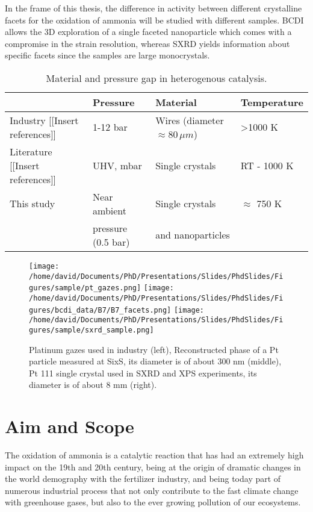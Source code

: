 In the frame of this thesis, the difference in activity between different crystalline facets for the oxidation of ammonia will be studied with different samples.
BCDI allows the 3D exploration of a single faceted nanoparticle which comes with a compromise in the strain resolution, whereas SXRD yields information about specific facets since the samples are large monocrystals.

\begin{table}[!htb]
    \centering
    \begin{tabular}{l|l|l|l}
    \toprule
                & Pressure    & Material       &     Temperature \\
    \midrule
    Industry {\color{DarkOrange}[[Insert references]]}  & 1-12 bar & Wires (diameter $\approx 80 \, \mu m$) & \textgreater 1000 K \\
    \midrule
    Literature {\color{DarkOrange}[[Insert references]]} & UHV, mbar & Single crystals & RT - 1000 K \\ \midrule
    This study & Near ambient    & Single crystals  & $\approx$ 750 K \\
               & pressure (0.5 bar)  & and nanoparticles & \\
    \bottomrule
    \end{tabular}
    \caption{Material and pressure gap in heterogenous catalysis.}
    \label{tab:gap}
\end{table}

\begin{figure}[!htb]
    \centering
    \texttt{[image: /home/david/Documents/PhD/Presentations/Slides/PhdSlides/Figures/sample/pt\_gazes.png]}
    \texttt{[image: /home/david/Documents/PhD/Presentations/Slides/PhdSlides/Figures/bcdi\_data/B7/B7\_facets.png]}
    \texttt{[image: /home/david/Documents/PhD/Presentations/Slides/PhdSlides/Figures/sample/sxrd\_sample.png]}
    \caption{Platinum gazes used in industry (left), Reconstructed phase of a Pt particle measured at SixS, its diameter is of about 300 nm (middle), Pt 111 single crystal used in SXRD and XPS experiments, its diameter is of about 8 mm (right).}
\end{figure}

\section{Aim and Scope}

The oxidation of ammonia is a catalytic reaction that has had an extremely high impact on the 19th and 20th century, being at the origin of dramatic changes in the world demography with the fertilizer industry, and being today part of numerous industrial process that not only contribute to the fast climate change with greenhouse gases, but also to the ever growing pollution of our ecosystems.

